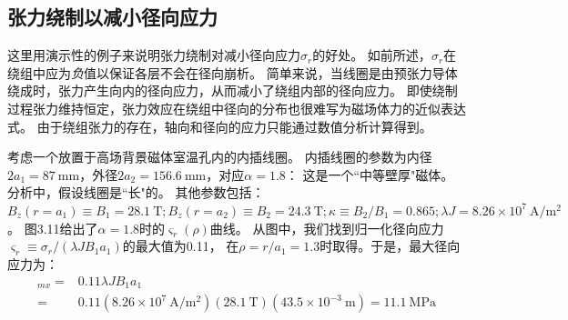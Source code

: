 \subsection{张力绕制以减小径向应力}
这里用演示性的例子来说明张力绕制对减小径向应力$\sigma_{r}$的好处。
如前所述，$\sigma_{r}$在绕组中应为\textit{负}值以保证各层不会在径向崩析。
简单来说，当线圈是由预张力导体绕成时，张力产生向内的径向应力，从而减小了绕组内部的径向应力。
即使绕制过程张力维持恒定，张力效应在绕组中径向的分布也很难写为磁场体力的近似表达式。
由于绕组张力的存在，轴向和径向的应力只能通过数值分析计算得到。

考虑一个放置于高场背景磁体室温孔内的内插线圈。
内插线圈的参数为内径$2a_1=87\ \mathrm{mm}$，外径$2a_2=156.6\ \mathrm{mm}$，对应$\alpha = 1.8$：
这是一个``中等壁厚"磁体。分析中，假设线圈是``长"的。
其他参数包括：
$B_z(r=a_1)\equiv B_1 =28.1\ \mathrm{T}; B_z(r=a_2)\equiv B_2 =24.3\ \mathrm{T};\kappa\equiv B_2/B_1 = 0.865; \lambda J =8.26×10^7 \ \mathrm{A/m^2}$。
图3.11给出了$\alpha=1.8$时的$\varsigma_r(\rho)$曲线。
从图中，我们找到归一化径向应力$\varsigma_r\equiv \sigma_r/(\lambda J B_1 a_1)$的最大值为0.11，
在$\rho=r/a_1=1.3$时取得。于是，最大径向应力为：
\begin{align*}
  [\sigma_r]_{mx}=&0.11\lambda JB_1 a_1 \\
   =&0.11(8.26\times 10^7 \ \mathrm{A/m^2})(28.1\ \mathrm{T})(43.5\times 10^{-3}\ \mathrm{m})=11.1\ \mathrm{MPa}
\end{align*}

